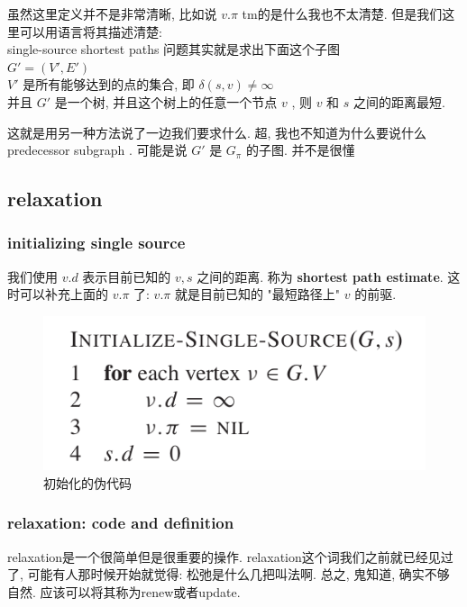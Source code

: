 \documentclass[a4paper, 10pt]{ctexart} %
\begin{document}
虽然这里定义并不是非常清晰, 比如说 $v.\pi$ tm的是什么我也不太清楚. 但是我们这里可以用语言将其描述清楚:
\\ [8pt]
\noindent single-source shortest paths 问题其实就是求出下面这个子图 
\\$G'  = \left(V '  , E'\right)$ \\ $V'$ 是所有能够达到的点的集合, 即 $\delta \left(s , v\right) \ne \infty$
\\并且 $G'$ 是一个树, 并且这个树上的任意一个节点 $v$ , 则 $v$ 和 $s$ 之间的距离最短. 

这就是用另一种方法说了一边我们要求什么. 
超, 我也不知道为什么要说什么 predecessor subgraph . 可能是说 $G'$ 是 $G_{\pi    }$ 的子图. 并不是很懂
\subsection{relaxation}
\subsubsection{initializing single source}
我们使用 $v.d$ 表示目前已知的 $v, s$ 之间的距离. 称为 \textbf{shortest path estimate}. 这时可以补充上面的 $v.\pi$ 了: $v.\pi$ 就是目前已知的 "最短路径上" $v$ 的前驱.

\begin{figure}[H]
    \centering
    \includegraphics[scale = 0.5]{sssp2.png}
    \caption{初始化的伪代码}
    \label{iss}
\end{figure}




\subsubsection{relaxation: code and definition}

relaxation是一个很简单但是很重要的操作. relaxation这个词我们之前就已经见过了, 可能有人那时候开始就觉得: 
松弛是什么几把叫法啊. 总之, 鬼知道, 确实不够自然. 
应该可以将其称为renew或者update. 
\end{document}
